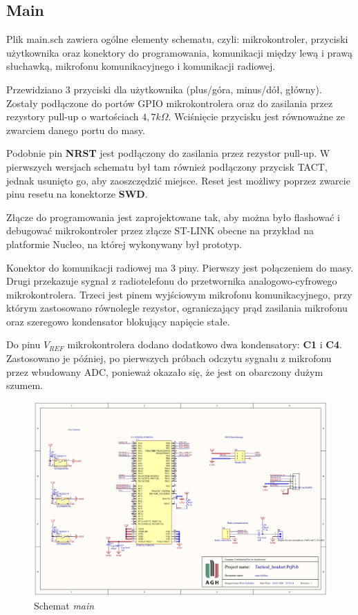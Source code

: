 \subsection{Main}

Plik main.sch zawiera ogólne elementy schematu, czyli: mikrokontroler, przyciski użytkownika oraz konektory do programowania, komunikacji między lewą i prawą słuchawką, mikrofonu komunikacyjnego i komunikacji radiowej.

Przewidziano 3 przyciski dla użytkownika (plus/góra, minus/dół, główny). Zostały podłączone do portów GPIO mikrokontrolera oraz do zasilania przez rezystory pull-up o wartościach $4,7k\Omega$. Wciśnięcie przycisku jest równoważne ze zwarciem danego portu do masy.

Podobnie pin \textbf{NRST} jest podłączony do zasilania przez rezystor pull-up. W pierwszych wersjach schematu był tam również podłączony przycisk TACT, jednak usunięto go, aby zaoszczędzić miejsce. Reset jest możliwy poprzez zwarcie pinu resetu na konektorze \textbf{SWD}.

Złącze do programowania jest zaprojektowane tak, aby można było flashować i debugować mikrokontroler przez złącze ST-LINK obecne na przykład na platformie Nucleo, na której wykonywany był prototyp. 

Konektor do komunikacji radiowej ma 3 piny. Pierwszy jest połączeniem do masy. Drugi przekazuje sygnał z radiotelefonu do przetwornika analogowo-cyfrowego mikrokontrolera. Trzeci jest pinem wyjściowym mikrofonu komunikacyjnego, przy którym zastosowano równolegle rezystor, ograniczający prąd zasilania mikrofonu oraz szeregowo kondensator blokujący napięcie stałe.

Do pinu $V_{REF}$ mikrokontrolera dodano dodatkowo dwa kondensatory: \textbf{C1} i \textbf{C4}. Zastosowano je później, po pierwszych próbach odczytu sygnału z mikrofonu przez wbudowany ADC, ponieważ okazało się, że jest on obarczony dużym szumem.

\begin{figure}[H]
	\centering
	\includegraphics[scale=0.4]{zdjecia/PCB/main.png}
	\caption{\label{main} Schemat \textit{main}}
\end{figure}


